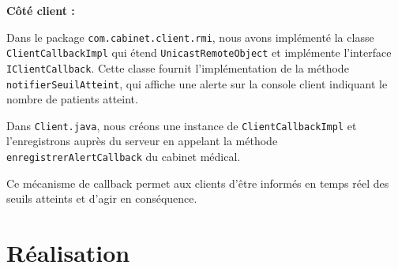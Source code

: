 \documentclass{article} %
\begin{document}
\bigskip
\textbf{Côté client :}

Dans le package \texttt{com.cabinet.client.rmi}, nous avons implémenté la classe \texttt{ClientCallbackImpl} qui étend \texttt{UnicastRemoteObject} et implémente l'interface \texttt{IClientCallback}. Cette classe fournit l'implémentation de la méthode \texttt{notifierSeuilAtteint}, qui affiche une alerte sur la console client indiquant le nombre de patients atteint.

\begin{sloppypar}
    Dans \texttt{Client.java}, nous créons une instance de \texttt{ClientCallbackImpl} et l'enregistrons auprès du serveur en appelant la méthode \texttt{enregistrerAlertCallback} du cabinet médical.
\end{sloppypar}

Ce mécanisme de callback permet aux clients d'être informés en temps réel des seuils atteints et d'agir en conséquence.


\newpage %

\section{Réalisation} %

\newpage %
\end{document}
